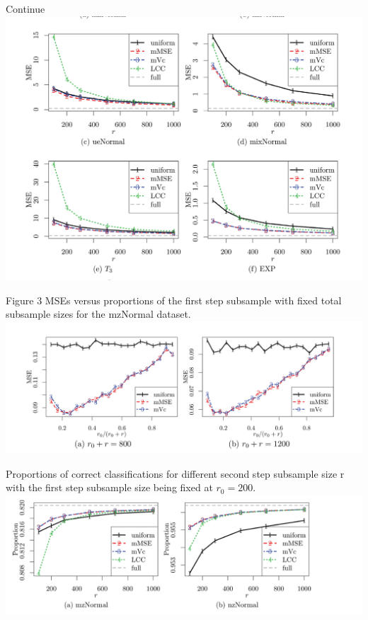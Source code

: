 \documentclass[12pt]{beamer}
\begin{document}
\begin{frame}{Continue}
\includegraphics[scale=0.8]{fig4.png} 
\end{frame}

\begin{frame}{Figure 3 MSEs versus proportions of the first step subsample with fixed total subsample sizes for the mzNormal dataset.}
\includegraphics[scale=1]{fig5.png} 
\end{frame}

\begin{frame}{Proportions of correct classifications for different second step subsample size r with the first step subsample size being fixed at $r_0=200$.}
\includegraphics[scale=1]{fig6.png} 
\end{frame}
\end{document}
